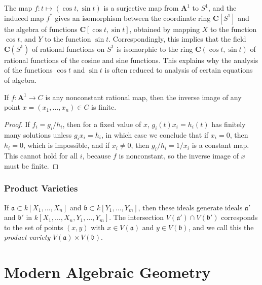 \begin{example}
    The map $f: t \mapsto (\cos t, \sin t)$ is a surjective map from $\mathbf{A}^1$ to $S^1$, and the induced map $f^*$ gives an isomorphism between the coordinate ring $\mathbf{C}[S^1]$ and the algebra of functions $\mathbf{C}[\cos t, \sin t]$, obtained by mapping $X$ to the function $\cos t$, and $Y$ to the function $\sin t$. Correspondingly, this implies that the field $\mathbf{C}(S^1)$ of rational functions on $S^1$ is isomorphic to the ring $\mathbf{C}(\cos t, \sin t)$ of rational functions of the cosine and sine functions. This explains why the analysis of the functions $\cos t$ and $\sin t$ is often reduced to analysis of certain equations of algebra.
\end{example}

\begin{theorem}
    If $f: \mathbf{A}^1 \to C$ is any nonconstant rational map, then the inverse image of any point $x = (x_1, \dots, x_n) \in C$ is finite.
\end{theorem}
\begin{proof}
    If $f_i = g_i/h_i$, then for a fixed value of $x$, $g_i(t)x_i = h_i(t)$ has finitely many solutions unless $g_ix_i = h_i$, in which case we conclude that if $x_i = 0$, then $h_i = 0$, which is impossible, and if $x_i \neq 0$, then $g_i/h_i = 1/x_i$ is a constant map. This cannot hold for all $i$, because $f$ is nonconstant, so the inverse image of $x$ must be finite.
\end{proof}

\section{Product Varieties}

If $\mathfrak{a} \subset k[X_1, \dots, X_n]$ and $\mathfrak{b} \subset k[Y_1, \dots, Y_m]$, then these ideals generate ideals $\mathfrak{a}'$ and $\mathfrak{b}'$ in $k[X_1, \dots, X_n, Y_1, \dots, Y_m]$. The intersection $V(\mathfrak{a}') \cap V(\mathfrak{b}')$ corresponds to the set of points $(x,y)$ with $x \in V(\mathfrak{a})$ and $y \in V(\mathfrak{b})$, and we call this the \emph{product variety} $V(\mathfrak{a}) \times V(\mathfrak{b})$.

\part{Modern Algebraic Geometry}

